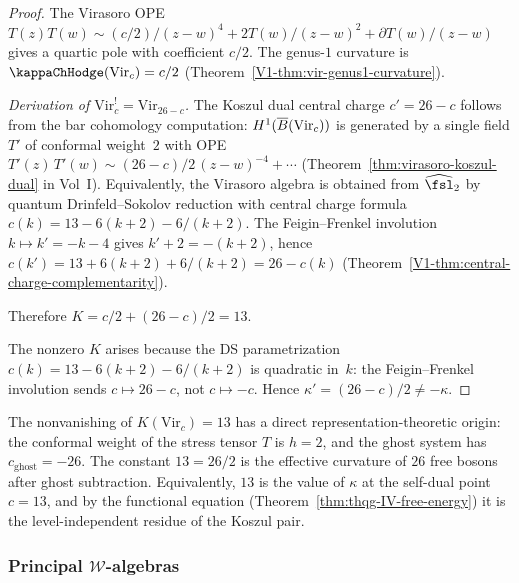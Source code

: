 \begin{proof}
The Virasoro OPE $T(z) T(w) \sim (c/2)/(z-w)^4 + 2T(w)/(z-w)^2
+ \partial T(w)/(z-w)$ gives a quartic pole with coefficient $c/2$.
The genus-$1$ curvature is $\kappaChHodge(\mathrm{Vir}_c) = c/2$
(Theorem~\ref{V1-thm:vir-genus1-curvature}).

\emph{Derivation of $\mathrm{Vir}_c^! = \mathrm{Vir}_{26-c}$.}
The Koszul dual central charge $c' = 26 - c$ follows from the bar
cohomology computation: $H^1(\overline{B}(\mathrm{Vir}_c))$ is generated
by a single field $T'$ of conformal weight~$2$ with OPE
$T'(z)\,T'(w) \sim (26-c)/2\,(z-w)^{-4} + \cdots$
(Theorem~\ref{thm:virasoro-koszul-dual} in Vol~I\@).
Equivalently, the Virasoro algebra is obtained from
$\widehat{\fsl}_2$ by quantum Drinfeld--Sokolov reduction with
central charge formula
$c(k) = 13 - 6(k+2) - 6/(k+2)$.
The Feigin--Frenkel involution $k \mapsto k' = -k - 4$ gives
$k' + 2 = -(k+2)$, hence
$c(k') = 13 + 6(k+2) + 6/(k+2) = 26 - c(k)$
(Theorem~\ref{V1-thm:central-charge-complementarity}).

Therefore
$K = c/2 + (26-c)/2 = 13$.

The nonzero $K$ arises because the DS parametrization
$c(k) = 13 - 6(k+2) - 6/(k+2)$ is quadratic in~$k$: the
Feigin--Frenkel involution sends $c \mapsto 26 - c$, not
$c \mapsto -c$. Hence
$\kappa' = (26-c)/2 \neq -\kappa$.
\end{proof}

\begin{remark}
The nonvanishing of $K(\mathrm{Vir}_c) = 13$ has a direct
representation-theoretic origin: the conformal weight of the stress tensor
$T$ is $h = 2$, and the ghost system has $c_{\mathrm{ghost}} = -26$.
The constant $13 = 26/2$ is the effective curvature of $26$ free bosons
after ghost subtraction. Equivalently, $13$ is the value of $\kappa$
at the self-dual point $c = 13$, and by the functional equation
(Theorem~\ref{thm:thqg-IV-free-energy}) it is the level-independent
residue of the Koszul pair.
\end{remark}

\subsubsection{Principal \texorpdfstring{$\mathcal{W}$}{W}-algebras}

